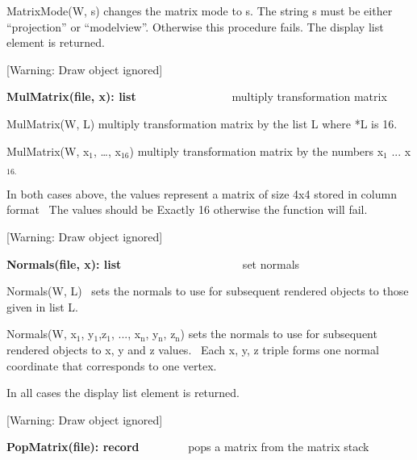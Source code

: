 \documentclass[letterpaper]{article}
\newcommand\textsubscript[1]{\ensuremath{{}_{\text{#1}}}}
\begin{document}
{
\textsf{MatrixMode(W, s)} changes the matrix mode to s. The string s must be either \textsf{{}``projection''} or
\textsf{{}``modelview''.} Otherwise this procedure fails. The display list element is returned. }


\bigskip

[Warning: Draw object ignored]

{
\textsf{\textbf{MulMatrix(file, x): list}}\textbf{ \ \ }\ \ \ \ \ \  \ \ \ \ \ \ \ \ multiply transformation matrix }


\bigskip

{
\textsf{MulMatrix(W, L)} multiply transformation matrix by the list L where *L is 16.}

{
\textsf{MulMatrix(W, x}\textsf{\textsubscript{1}}\textsf{, {\dots}, x}\textsf{\textsubscript{16}}\textsf{) }multiply
transformation matrix by the numbers x\textsubscript{1} ... x\textsubscript{16.}}

{
In both cases above, the values represent a matrix of size 4x4 stored in column format \ The values should be Exactly 16
otherwise the function will fail. }

[Warning: Draw object ignored]


\bigskip

{
\textsf{\textbf{Normals(file, x): list\ \ \ \ \ \ \ \ \ \ }}\ \ \ \ \ \  \ \ \ \ set normals}


\bigskip

{
\textsf{Normals(W, L)} \ sets the normals to use for subsequent rendered objects to those given in list L.}

{
\textsf{Normals(W, x}\textsf{\textsubscript{1}}\textsf{,
y}\textsf{\textsubscript{1}}\textsf{,z}\textsf{\textsubscript{1}}\textsf{, ..., x}\textsf{\textsubscript{n}}\textsf{,
y}\textsf{\textsubscript{n}}\textsf{, z}\textsf{\textsubscript{n}}\textsf{) }sets the normals to use for subsequent
rendered objects to x, y and z values. \ Each x, y, z triple forms one normal coordinate that corresponds to one
vertex.}

{
In all cases the display list element is returned.}

[Warning: Draw object ignored]

{
\textsf{\textbf{PopMatrix(file): record}} \ \ \ \ \ \ \ \  pops a matrix from the matrix stack}
\end{document}
